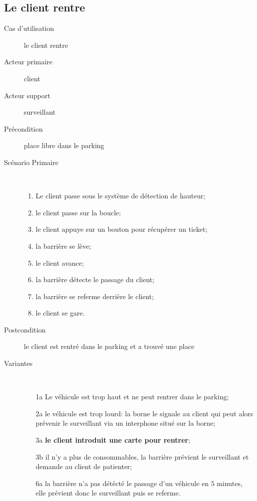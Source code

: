 \documentclass[a4paper]{article}
\begin{document}
\subsection{Le client rentre}
\begin{description}
	\item[Cas d'utilisation] le client rentre
	\item[Acteur primaire] client
	\item[Acteur support] surveillant
	\item[Pr\'econdition] place libre dans le parking
	\item[Sc\'enario Primaire] \
	\begin{enumerate}
		\item Le client passe sous le syst\`eme de d\'etection de hauteur;
		\item le client passe sur la boucle;
		\item le client appuye sur un bouton pour r\'ecup\'erer un ticket;
		\item la barri\`ere se l\`eve;
		\item le client avance;
		\item la barri\`ere d\'etecte le passage du client;
		\item la barri\`ere se referme derri\`ere le client;
		\item le client se gare.
	\end{enumerate}
	\item[Postcondition] le client est rentr\'e dans le parking et a trouv\'e une place
	\item[Variantes] \
	\begin{enumerate}
		\item[1a] Le v\'ehicule est trop haut et ne peut rentrer dans
			le parking;
		\item[2a] le v\'ehicule est trop lourd: la borne le signale au client
			qui peut alors pr\'evenir le surveillant via un interphone situ\'e
			sur la borne;
		\item[3a] \textbf{le client introduit une carte pour rentrer};
		\item[3b] il n'y a plus de consommables, la barri\`ere pr\'evient
			le surveillant et demande au client de patienter;
		\item[6a] la barri\`ere n'a pas d\'et\'ect\'e le passage d'un v\'ehicule
			en $5$ minutes, elle pr\'evient donc le surveillant puis se referme.
	\end{enumerate}
\end{description}
\end{document}
